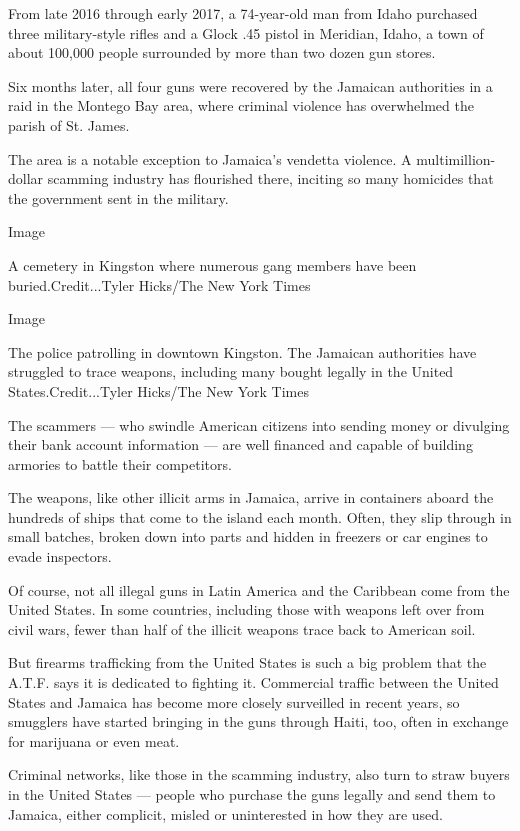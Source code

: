 From late 2016 through early 2017, a 74-year-old man from Idaho
purchased three military-style rifles and a Glock .45 pistol in
Meridian, Idaho, a town of about 100,000 people surrounded by more than
two dozen gun stores.

Six months later, all four guns were recovered by the Jamaican
authorities in a raid in the Montego Bay area, where criminal violence
has overwhelmed the parish of St. James.

The area is a notable exception to Jamaica's vendetta violence. A
multimillion-dollar scamming industry has flourished there, inciting so
many homicides that the government sent in the military.

Image

A cemetery in Kingston where numerous gang members have been
buried.Credit...Tyler Hicks/The New York Times

Image

The police patrolling in downtown Kingston. The Jamaican authorities
have struggled to trace weapons, including many bought legally in the
United States.Credit...Tyler Hicks/The New York Times

The scammers --- who swindle American citizens into sending money or
divulging their bank account information --- are well financed and
capable of building armories to battle their competitors.

The weapons, like other illicit arms in Jamaica, arrive in containers
aboard the hundreds of ships that come to the island each month. Often,
they slip through in small batches, broken down into parts and hidden in
freezers or car engines to evade inspectors.

Of course, not all illegal guns in Latin America and the Caribbean come
from the United States. In some countries, including those with weapons
left over from civil wars, fewer than half of the illicit weapons trace
back to American soil.

But firearms trafficking from the United States is such a big problem
that the A.T.F. says it is dedicated to fighting it. Commercial traffic
between the United States and Jamaica has become more closely surveilled
in recent years, so smugglers have started bringing in the guns through
Haiti, too, often in exchange for marijuana or even meat.

Criminal networks, like those in the scamming industry, also turn to
straw buyers in the United States --- people who purchase the guns
legally and send them to Jamaica, either complicit, misled or
uninterested in how they are used.


